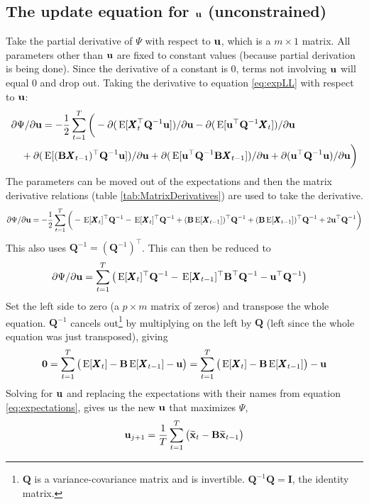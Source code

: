 \documentclass[]{article}
\def\UPS{\mbox{\boldmath $\Upsilon$}}
\def\BB{\mbox{$\mathbf B$}}	\def\bb{\mbox{$\mathbf b$}} \def\Bb{\mbox{$\mathbf J$}} \def\Ba{\mbox{$\mathbf L$}} \def\Bm{\UPS}
\def\E{\,\textup{\textrm{E}}}
\def\II{\mbox{$\mathbf I$}} \def\ii{\mbox{$\mathbf i$}}
\def\QQ{\mbox{$\mathbf Q$}}	 \def\qq{\mbox{$\mathbf q$}} \def\Qb{\mbox{$\mathbf G$}}  \def\Qm{\mathbb{Q}}
\def\XX{\mbox{$\pmb{X}$}}	\def\xx{\mbox{$\pmb{x}$}}
\def\hatxt{\widetilde{\mbox{$\mathbf x$}}_t}
\def\hatxtm{\widetilde{\mbox{$\mathbf x$}}_{t-1}}
\begin{document}
\subsection{The update equation for $\mbox{$\mathbf u$}$ (unconstrained)}
Take the partial derivative of $\Psi$ with respect to $\mbox{$\mathbf u$}$, which is a $m \times 1$ matrix. All parameters other than $\mbox{$\mathbf u$}$ are fixed to constant values (because partial derivation is being done).  Since the derivative of a constant is 0, terms not involving $\mbox{$\mathbf u$}$ will equal 0 and drop out.  Taking the derivative to equation \ref{eq:expLL} with respect to $\mbox{$\mathbf u$}$:
\begin{equation}\label{eq:u.unconstrained1}
\begin{split}
&\partial\Psi/\partial\uu = - \frac{1}{2}\sum_{t=1}^T \bigg(-  \partial(\E[\XX_t^\top\QQ^{-1}\uu])/\partial\uu
- \partial(\E[\uu^\top\QQ^{-1}\XX_t])/\partial\uu \\
&\quad + \partial(\E[(\BB\XX_{t-1})^\top\QQ^{-1}\uu])/\partial\uu 
+ \partial(\E[\uu^\top\QQ^{-1}\BB\XX_{t-1}])/\partial\uu + \partial(\uu^\top\QQ^{-1}\uu)/\partial\uu \bigg)
\end{split}
\end{equation}
The parameters can be moved out of the expectations and then the matrix derivative relations (table \ref{tab:MatrixDerivatives}) are used to take the derivative. 
\begin{equation}\label{eq:u.unconstrained2}
\begin{split}
\partial\Psi/\partial\uu = - \frac{1}{2}\sum_{t=1}^T\bigg(- \E[\XX_t]^\top\QQ^{-1} 
- \E[\XX_t]^\top\QQ^{-1} + (\BB\E[\XX_{t-1}])^\top\QQ^{-1} + (\BB\E[\XX_{t-1}])^\top\QQ^{-1} + 2\uu^\top\QQ^{-1} \bigg)
\end{split}
\end{equation}
This also uses $\QQ^{-1} = (\QQ^{-1})^\top$. This can then be reduced to 
\begin{equation}\label{eq:u.unconstrained3}
\begin{split}
&\partial\Psi/\partial\uu = \sum_{t=1}^T\big(\E[\XX_t]^\top\QQ^{-1} 
 - \E[\XX_{t-1}]^\top\BB^\top\QQ^{-1} -  \uu^\top\QQ^{-1} \big)
\end{split}
\end{equation}
Set the left side to zero (a $p \times m$ matrix of zeros) and transpose the whole equation. $\QQ^{-1}$ cancels out\footnote{$\QQ$ is a variance-covariance matrix and is invertible. $\QQ^{-1}\QQ=\II$, the identity matrix.} by multiplying on the left by $\QQ$ (left since the whole equation was just transposed), giving
\begin{equation}\label{eq:u.unconstrained4}
\mathbf{0} = \sum_{t=1}^T\big(\E[\XX_t] - \BB\E[\XX_{t-1}] - \uu \big)
= \sum_{t=1}^T\big(\E[\XX_t] - \BB\E[\XX_{t-1}] \big) - \uu
\end{equation}
Solving for $\mbox{$\mathbf u$}$ and replacing the expectations with their names from equation \ref{eq:expectations}, gives us the new $\mbox{$\mathbf u$}$ that maximizes $\Psi$, 
\begin{equation}\label{eq:uupdate.unconstrained}
\uu_{j+1} =  \frac{1}{T} \sum_{t=1}^T\big(\hatxt - \BB\hatxtm \big)
\end{equation}
\end{document}
